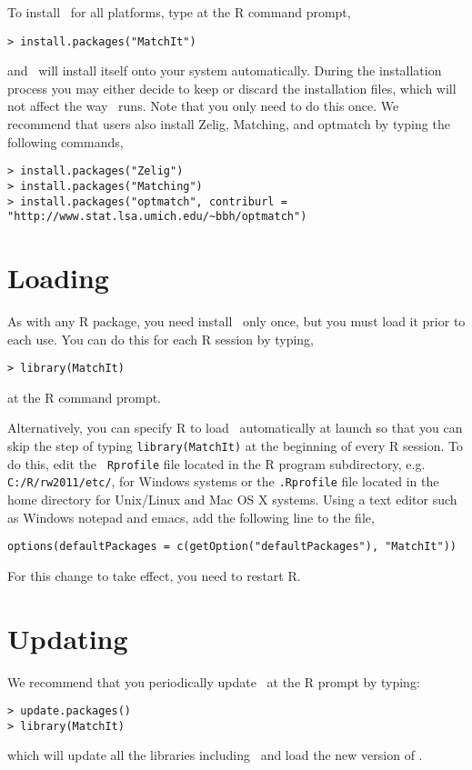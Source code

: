 To install \MatchIt\ for all platforms, type at the R command prompt,
\begin{verbatim}
> install.packages("MatchIt")
\end{verbatim}
and \MatchIt\ will install itself onto your system automatically.
During the installation process you may either decide to keep or
discard the installation files, which will not affect the way
\MatchIt\ runs.  Note that you only need to do this once.  
We recommend that users also install Zelig, Matching, and optmatch by
typing the following commands,
\begin{verbatim}
> install.packages("Zelig")
> install.packages("Matching")
> install.packages("optmatch", contriburl = "http://www.stat.lsa.umich.edu/~bbh/optmatch")
\end{verbatim}


\section{Loading \MatchIt} \label{sec:load}

As with any R package, you need install \MatchIt\ only once, but you
must load it prior to each use.  You can do this for each R session by
typing,
\begin{verbatim}
> library(MatchIt)
\end{verbatim}
at the R command prompt.  

Alternatively, you can specify R to load \MatchIt\ automatically at
launch so that you can skip the step of typing {\tt library(MatchIt)}
at the beginning of every R session.  To do this, edit the {\tt
  Rprofile} file located in the R program subdirectory, e.g.
\texttt{C:/R/rw2011/etc/}, for Windows systems or the {\tt .Rprofile}
file located in the home directory for Unix/Linux and Mac OS X
systems.  Using a text editor such as Windows notepad and emacs, add
the following line to the file,
\begin{verbatim}
options(defaultPackages = c(getOption("defaultPackages"), "MatchIt"))
\end{verbatim}
For this change to take effect, you need to restart R.

\section{Updating \MatchIt}

We recommend that you periodically update \MatchIt\ at the R prompt by typing:
\begin{verbatim}
> update.packages()
> library(MatchIt)
\end{verbatim}
which will update all the libraries including \MatchIt\ and load the
new version of \MatchIt.


